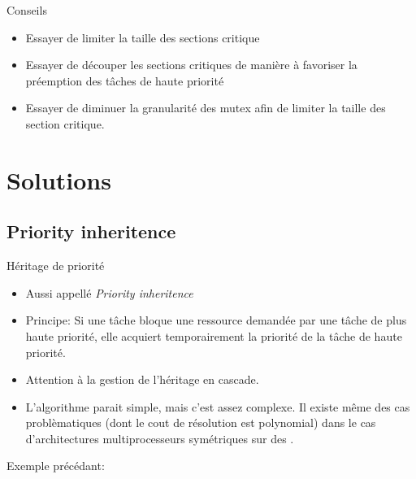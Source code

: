 \begin{frame}{Conseils}
  \begin{itemize} 
  \item Essayer de limiter la taille des sections critique
  \item  Essayer  de découper  les  sections  critiques  de manière  à
    favoriser la préemption des tâches de haute priorité
  \item Essayer de  diminuer la granularité des mutex  afin de limiter
    la taille des section critique.
  \end{itemize} 
\end{frame} 

\section{Solutions}

\subsection{Priority inheritence}

\begin{frame}{Héritage de priorité}
  \begin{itemize} 
  \item Aussi appellé \emph{Priority inheritence}
  \item Principe: Si  une tâche bloque une ressource  demandée par une
    tâche  de plus  haute  priorité, elle  acquiert temporairement  la
    priorité de la tâche de haute priorité.
  \item Attention à la gestion de l'héritage en cascade.
  \item  L'algorithme parait  simple,  mais c'est  assez complexe.  Il
    existe même des cas problèmatiques (dont le cout de résolution est
    polynomial)   dans   le   cas   d'architectures   multiprocesseurs
    symétriques sur des .
  \end{itemize} 
  Exemple précédant:
  \begin{center}
  \end{center}
\end{frame} 

